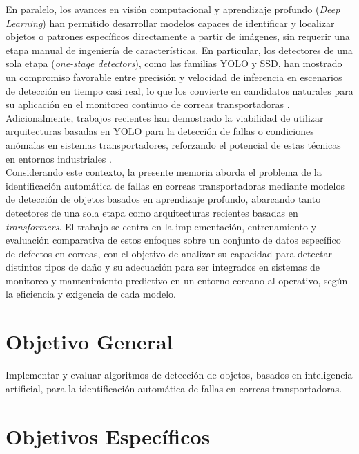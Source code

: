 En paralelo, los avances en visión computacional y aprendizaje profundo (\textit{Deep Learning}) han permitido desarrollar modelos capaces de identificar y localizar objetos o patrones específicos directamente a partir de imágenes, sin requerir una etapa manual de ingeniería de características. En particular, los detectores de una sola etapa (\textit{one-stage detectors}), como las familias YOLO y SSD, han mostrado un compromiso favorable entre precisión y velocidad de inferencia en escenarios de detección en tiempo casi real, lo que los convierte en candidatos naturales para su aplicación en el monitoreo continuo de correas transportadoras \cite{zhang2021deep,zhang2021one_stage}. Adicionalmente, trabajos recientes han demostrado la viabilidad de utilizar arquitecturas basadas en YOLO para la detección de fallas o condiciones anómalas en sistemas transportadores, reforzando el potencial de estas técnicas en entornos industriales \cite{angulo2024deteccion}. \\

Considerando este contexto, la presente memoria aborda el problema de la identificación automática de fallas en correas transportadoras mediante modelos de detección de objetos basados en aprendizaje profundo, abarcando tanto detectores de una sola etapa como arquitecturas recientes basadas en \textit{transformers}. El trabajo se centra en la implementación, entrenamiento y evaluación comparativa de estos enfoques sobre un conjunto de datos específico de defectos en correas, con el objetivo de analizar su capacidad para detectar distintos tipos de daño y su adecuación para ser integrados en sistemas de monitoreo y mantenimiento predictivo en un entorno cercano al operativo, según la eficiencia y exigencia de cada modelo. \\





\section{Objetivo General}

Implementar y evaluar algoritmos
de detección de objetos, basados en
inteligencia artificial, para la identificación automática de
fallas en correas transportadoras.



\section{Objetivos Específicos}


